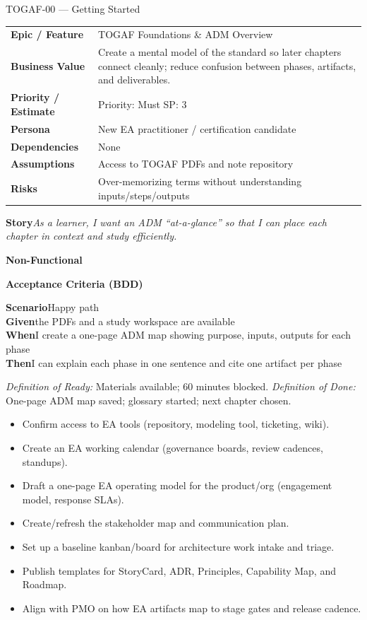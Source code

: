 \documentclass[11pt,a4paper]{article}
\newcommand{\Tag}[1]{%
  \tcbox[
    on line, rounded corners,
    colback=chipback, colframe=chipborder,
    boxrule=0.3pt, left=5pt, right=5pt, top=2pt, bottom=2pt]{\footnotesize #1}%
}
\newlength{\StoryLabelWidth}
\newlength{\StoryValueWidth}
\newcommand{\Field}[2]{\textbf{#1} & #2\\}
\newcommand{\StoryText}[1]{\textbf{Story}\quad \textit{#1}}
\newcommand{\NonFunctional}[1]{\textbf{Non-Functional}\quad #1}
\newcommand{\BDDHeader}{\textbf{Acceptance Criteria (BDD)}}
\newcommand{\BDDRow}[2]{\textbf{#1}\quad #2}
\newcommand{\DOR}[1]{\textit{\footnotesize Definition of Ready:} #1}
\newcommand{\DOD}[1]{\textit{\footnotesize Definition of Done:} #1}
\newcommand{\Task}[1]{\item[$\square$] #1}
\providecommand{\Field}[2]{\textbf{#1} & #2\\}
\begin{document}
\begin{StoryCard}{TOGAF-00 — Getting Started}
\par\setlength{\StoryLabelWidth}{0.27\linewidth}%
\setlength{\StoryValueWidth}{\dimexpr\linewidth-\StoryLabelWidth-2\tabcolsep-10pt\relax}%
\noindent\begin{tabular}{@{}>{\RaggedRight\arraybackslash\bfseries}p{\StoryLabelWidth}>{\RaggedRight\arraybackslash}p{\StoryValueWidth}@{}}
  \Field{Epic / Feature}{TOGAF Foundations \& ADM Overview}
  \Field{Business Value}{Create a mental model of the standard so later chapters connect cleanly; reduce confusion between phases, artifacts, and deliverables.}
  \Field{Priority / Estimate}{Priority: Must \quad\quad SP: 3}
  \Field{Persona}{New EA practitioner / certification candidate}
  \Field{Dependencies}{None}
  \Field{Assumptions}{Access to TOGAF PDFs and note repository}
  \Field{Risks}{Over-memorizing terms without understanding inputs/steps/outputs}
\end{tabular}\par

\vspace{4pt}
\StoryText{As a learner, I want an ADM ``at-a-glance'' so that I can place each chapter in context and study efficiently.}

\vspace{2pt}
\NonFunctional{\Tag{Accuracy} \Tag{Clarity} \Tag{Traceability}}

\vspace{6pt}
\BDDHeader

\BDDRow{Scenario}{Happy path}\\
\BDDRow{Given}{the PDFs and a study workspace are available}\\
\BDDRow{When}{I create a one-page ADM map showing purpose, inputs, outputs for each phase}\\
\BDDRow{Then}{I can explain each phase in one sentence and cite one artifact per phase}

\vspace{6pt}
\DOR{Materials available; 60 minutes blocked.}\quad
\DOD{One-page ADM map saved; glossary started; next chapter chosen.}
\end{StoryCard}
\begin{TasksBox}
\begin{itemize}[label={}, leftmargin=*]
\Task{Confirm access to EA tools (repository, modeling tool, ticketing, wiki).}
\Task{Create an EA working calendar (governance boards, review cadences, standups).}
\Task{Draft a one-page EA operating model for the product/org (engagement model, response SLAs).}
\Task{Create/refresh the stakeholder map and communication plan.}
\Task{Set up a baseline kanban/board for architecture work intake and triage.}
\Task{Publish templates for StoryCard, ADR, Principles, Capability Map, and Roadmap.}
\Task{Align with PMO on how EA artifacts map to stage gates and release cadence.}
\end{itemize}
\end{TasksBox}
\end{document}
